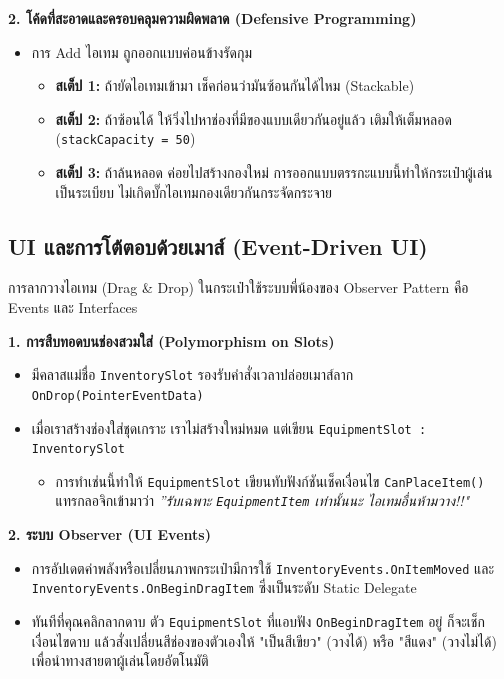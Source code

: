 \textbf{2. โค้ดที่สะอาดและครอบคลุมความผิดพลาด (Defensive Programming)}

\begin{itemize}
\item การ Add ไอเทม ถูกออกแบบค่อนข้างรัดกุม
    \begin{itemize}
    \item \textbf{สเต็ป 1:} ถ้ายัดไอเทมเข้ามา เช็คก่อนว่ามันซ้อนกันได้ไหม (Stackable)
    \item \textbf{สเต็ป 2:} ถ้าซ้อนได้ ให้วิ่งไปหาช่องที่มีของแบบเดียวกันอยู่แล้ว เติมให้เต็มหลอด (\texttt{stackCapacity = 50})
    \item \textbf{สเต็ป 3:} ถ้าล้นหลอด ค่อยไปสร้างกองใหม่ การออกแบบตรรกะแบบนี้ทำให้กระเป๋าผู้เล่นเป็นระเบียบ ไม่เกิดบั๊กไอเทมกองเดียวกันกระจัดกระจาย
    \end{itemize}
\end{itemize}

\subsection{UI และการโต้ตอบด้วยเมาส์ (Event-Driven UI)}

การลากวางไอเทม (Drag \& Drop) ในกระเป๋าใช้ระบบพี่น้องของ Observer Pattern คือ Events และ Interfaces

\textbf{1. การสืบทอดบนช่องสวมใส่ (Polymorphism on Slots)}

\begin{itemize}
\item มีคลาสแม่ชื่อ \texttt{InventorySlot} รองรับคำสั่งเวลาปล่อยเมาส์ลาก \texttt{OnDrop(PointerEventData)}
\item เมื่อเราสร้างช่องใส่ชุดเกราะ เราไม่สร้างใหม่หมด แต่เขียน \texttt{EquipmentSlot : InventorySlot}
    \begin{itemize}
    \item การทำเช่นนี้ทำให้ \texttt{EquipmentSlot} เขียนทับฟังก์ชันเช็คเงื่อนไข \texttt{CanPlaceItem()} แทรกลอจิกเข้ามาว่า \textit{''รับเฉพาะ \texttt{EquipmentItem} เท่านั้นนะ ไอเทมอื่นห้ามวาง!!"}
    \end{itemize}
\end{itemize}

\textbf{2. ระบบ Observer (UI Events)}

\begin{itemize}
\item การอัปเดตค่าพลังหรือเปลี่ยนภาพกระเป๋ามีการใช้ \texttt{InventoryEvents.OnItemMoved} และ \texttt{InventoryEvents.OnBeginDragItem} ซึ่งเป็นระดับ Static Delegate
\item ทันทีที่คุณคลิกลากดาบ ตัว \texttt{EquipmentSlot} ที่แอบฟัง \texttt{OnBeginDragItem} อยู่ ก็จะเช็กเงื่อนไขดาบ แล้วสั่งเปลี่ยนสีช่องของตัวเองให้ "เป็นสีเขียว" (วางได้) หรือ "สีแดง" (วางไม่ได้) เพื่อนำทางสายตาผู้เล่นโดยอัตโนมัติ
\end{itemize}

